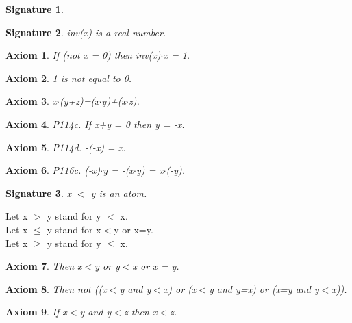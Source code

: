 \documentclass{article}
\newenvironment{forthel}{\begin{leftbar}}{\end{leftbar}}
\newtheorem{axiom}{Axiom}
\newtheorem{signature}{Signature}
\begin{document}
\begin{forthel}
\begin{signature}
\end{signature}
\begin{signature} inv(x) is a real number.

\end{signature}
\begin{axiom} If (not x = 0) then inv(x)$\cdot$x = 1.

\end{axiom}
\begin{axiom} 1 is not equal to 0.

\end{axiom}

\begin{axiom} x$\cdot$(y+z)=(x$\cdot$y)+(x$\cdot$z).

\end{axiom}


\begin{axiom} P114c. If x+y = 0 then y = -x.

\end{axiom}
\begin{axiom} P114d. -(-x) = x.

\end{axiom}

\begin{axiom} P116c. (-x)$\cdot$y = -(x$\cdot$y) = x$\cdot$(-y).

\end{axiom}




\begin{signature} x $<$ y is an atom.

\end{signature}
Let x $>$ y stand for y $<$ x.\\
Let x $\leq$ y stand for x$<$y or x=y.\\
Let x $\geq$ y stand for y $\leq$ x.\\

\begin{axiom} Then x$<$y or y$<$x or x = y.

\end{axiom}
\begin{axiom} Then not ((x$<$y and y$<$x) or (x$<$y and y=x) or (x=y and y$<$x)).

\end{axiom}
\begin{axiom} If x$<$y and y$<$z then x$<$z.

\end{axiom}






\end{forthel}
\end{document}
